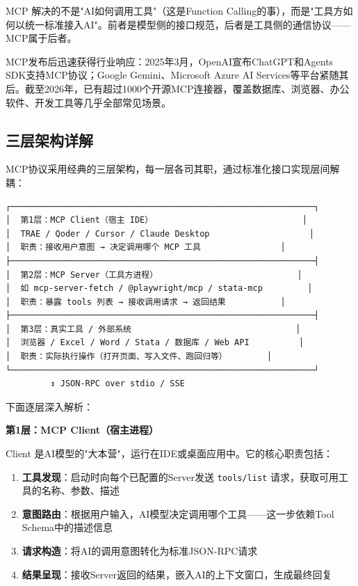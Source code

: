 \begin{notebox}[关键定位]
MCP 解决的不是"AI如何调用工具"（这是Function Calling的事），而是"工具方如何以统一标准接入AI"。前者是模型侧的接口规范，后者是工具侧的通信协议——MCP属于后者。
\end{notebox}

MCP发布后迅速获得行业响应：2025年3月，OpenAI宣布ChatGPT和Agents SDK支持MCP协议；Google Gemini、Microsoft Azure AI Services等平台紧随其后。截至2026年，已有超过1000个开源MCP连接器，覆盖数据库、浏览器、办公软件、开发工具等几乎全部常见场景。

\subsection{三层架构详解}

MCP协议采用经典的三层架构，每一层各司其职，通过标准化接口实现层间解耦：

\begin{verbatim}
┌─────────────────────────────────────────────────────────────┐
│  第1层：MCP Client（宿主 IDE）                              │
│  TRAE / Qoder / Cursor / Claude Desktop                    │
│  职责：接收用户意图 → 决定调用哪个 MCP 工具                │
├─────────────────────────────────────────────────────────────┤
│  第2层：MCP Server（工具方进程）                            │
│  如 mcp-server-fetch / @playwright/mcp / stata-mcp         │
│  职责：暴露 tools 列表 → 接收调用请求 → 返回结果           │
├─────────────────────────────────────────────────────────────┤
│  第3层：真实工具 / 外部系统                                 │
│  浏览器 / Excel / Word / Stata / 数据库 / Web API          │
│  职责：实际执行操作（打开页面、写入文件、跑回归等）        │
└─────────────────────────────────────────────────────────────┘
         ↕ JSON-RPC over stdio / SSE
\end{verbatim}

下面逐层深入解析：

\textbf{第1层：MCP Client（宿主进程）}

Client 是AI模型的"大本营"，运行在IDE或桌面应用中。它的核心职责包括：

\begin{enumerate}[leftmargin=2em]
  \item \textbf{工具发现}：启动时向每个已配置的Server发送 \texttt{tools/list} 请求，获取可用工具的名称、参数、描述
  \item \textbf{意图路由}：根据用户输入，AI模型决定调用哪个工具——这一步依赖Tool Schema中的描述信息
  \item \textbf{请求构造}：将AI的调用意图转化为标准JSON-RPC请求
  \item \textbf{结果呈现}：接收Server返回的结果，嵌入AI的上下文窗口，生成最终回复
\end{enumerate}

